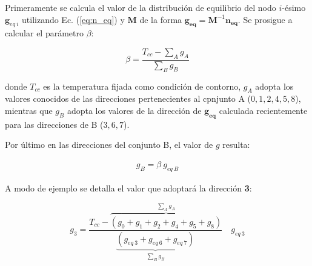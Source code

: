 Primeramente se calcula el valor de la distribución de equilibrio del nodo $i$-ésimo $\mathbf{g}_{eq\>i}$ utilizando Ec. (\ref{eq:n_eq}) y $\mathbf{M}$ de la forma $\mathbf{g_{eq}} = \mathbf{M}^{-1} \mathbf{n_{eq}}$. Se prosigue a calcular el parámetro $\beta$:

\begin{equation}
\beta = \frac{T_{cc} - \sum_{A} g_{A}}{\sum_{B} g_{B}}
\label{eq:beta}
\end{equation}

donde $T_{cc}$ es la temperatura fijada como condición de contorno, $g_{A}$ adopta los valores conocidos de las direcciones pertenecientes al cpnjunto A ($0, 1, 2, 4, 5, 8 $), mientras que $g_{B}$ adopta los valores de la dirección de $\mathbf{g_{eq}}$ calculada recientemente para las direcciones de B ($3, 6, 7$).

Por último en las direcciones del conjunto B, el valor de $g$ resulta:

\begin{align}
	g_{B} = \beta \> g_{eq \> B} 
\end{align}

A modo de ejemplo se detalla el valor que adoptará la dirección \textbf{3}:

\begin{equation}
	g_{3} = \frac{T_{cc} - \overbrace{\left( g_{0} + g_{1} +g_{2} + g_{4} + g_{5} + g_{8} \right)}^{\sum_{A} g_{A}} }{\underbrace{\left( g_{eq\>3} + g_{eq\>6} + g_{eq\>7} \right)}_{\sum_{B} g_{B} }} \quad g_{eq\>3}
\end{equation}


